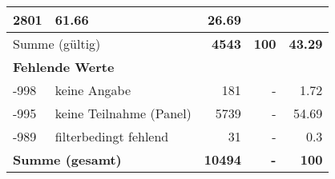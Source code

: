\begin{longtable}{lXrrr}
       \num{2801} &
       \num[round-mode=places,round-precision=2]{61.66} &
         \num[round-mode=places,round-precision=2]{26.69} \\
     \midrule
     \multicolumn{2}{l}{Summe (gültig)} &
       \textbf{\num{4543}} &
     \textbf{\num{100}} &
       \textbf{\num[round-mode=places,round-precision=2]{43.29}} \\
     \multicolumn{5}{l}{\textbf{Fehlende Werte}}\\
       -998 &
       keine Angabe &
         \num{181} &
        - &
         \num[round-mode=places,round-precision=2]{1.72} \\
       -995 &
       keine Teilnahme (Panel) &
         \num{5739} &
        - &
         \num[round-mode=places,round-precision=2]{54.69} \\
       -989 &
       filterbedingt fehlend &
         \num{31} &
        - &
         \num[round-mode=places,round-precision=2]{0.3} \\
     \midrule
     \multicolumn{2}{l}{\textbf{Summe (gesamt)}} &
          \textbf{\num{10494}} &
        \textbf{-} &
        \textbf{\num{100}} \\
     \bottomrule
     \end{longtable}
     
